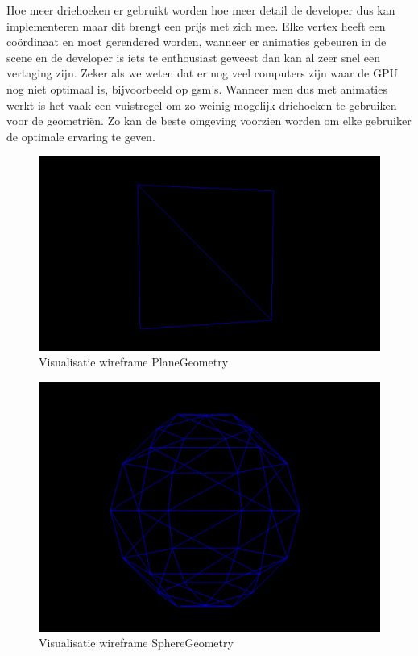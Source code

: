 Hoe meer driehoeken er gebruikt worden hoe meer detail de developer dus kan implementeren maar dit brengt een prijs met zich mee. Elke vertex heeft een coördinaat en moet gerendered worden, wanneer er animaties gebeuren in de scene en de developer is iets te enthousiast geweest dan kan al zeer snel een vertaging zijn. Zeker als we weten dat er nog veel computers zijn waar de GPU nog niet optimaal is, bijvoorbeeld op gsm's. Wanneer men dus met animaties werkt is het vaak een vuistregel om zo weinig mogelijk driehoeken te gebruiken voor de geometriën. Zo kan de beste omgeving voorzien worden om elke gebruiker de optimale ervaring te geven.

\begin{figure}
	\centering
	\includegraphics[width=1\linewidth]{graphics/planeGeometry}
	\caption[Visualisatie wireframe PlaneGeometry]{Visualisatie wireframe PlaneGeometry}
	\label{fig:planeGeometry}
\end{figure}

\begin{figure}
	\centering
	\includegraphics[width=1\linewidth]{graphics/sphereGeometry}
	\caption[Visualisatie wireframe SphereGeometry]{Visualisatie wireframe SphereGeometry}
	\label{fig:sphereGeometry}
\end{figure}


